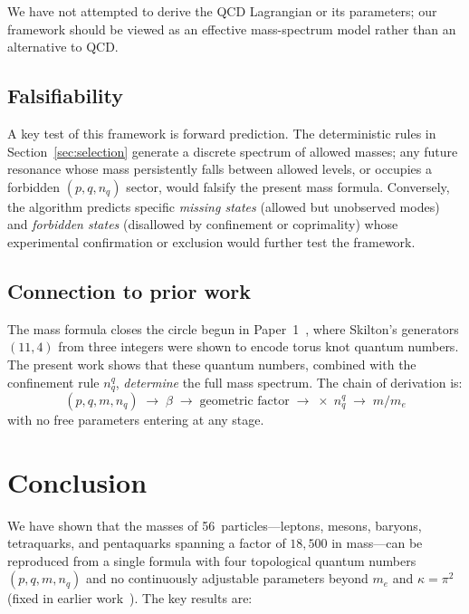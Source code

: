 \documentclass[11pt,a4paper]{article}
\begin{document}
We have not attempted to derive the QCD Lagrangian or its parameters;
our framework should be viewed as an effective mass-spectrum model
rather than an alternative to QCD.

\subsection{Falsifiability}

A key test of this framework is forward prediction.  The
deterministic rules in Section~\ref{sec:selection} generate a
discrete spectrum of allowed masses; any future resonance whose mass
persistently falls between allowed levels, or occupies a forbidden
$(p,q,n_q)$ sector, would falsify the present mass formula.
Conversely, the algorithm predicts specific \emph{missing states}
(allowed but unobserved modes) and \emph{forbidden states}
(disallowed by confinement or coprimality) whose experimental
confirmation or exclusion would further test the framework.

\subsection{Connection to prior work}

The mass formula closes the circle begun in Paper~1~\cite{paper1},
where Skilton's generators $(11, 4)$ from three integers were shown
to encode torus knot quantum numbers.  The present work shows that
these quantum numbers, combined with the confinement rule $n_q^q$,
\emph{determine} the full mass spectrum.  The chain of derivation
is:
\[
  (p,q,m,n_q) \;\longrightarrow\; \beta
  \;\longrightarrow\; \text{geometric factor}
  \;\longrightarrow\; \times\; n_q^q
  \;\longrightarrow\; m/m_e
\]
with no free parameters entering at any stage.


\section{Conclusion}
\label{sec:conclusion}

We have shown that the masses of 56~particles---leptons, mesons,
baryons, tetraquarks, and pentaquarks spanning a factor of
$18{,}500$ in mass---can be reproduced from a single formula with four topological quantum numbers
$(p, q, m, n_q)$ and no continuously adjustable parameters beyond
$m_e$ and $\kappa = \pi^2$ (fixed in earlier work~\cite{paper4,paper5}).
The key results are:
\end{document}
